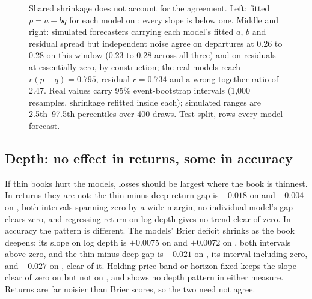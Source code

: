 \begin{figure}[!tbp]
\centering

\caption{Shared shrinkage does not account for the agreement. Left: fitted $p = a + bq$ for
each model on \winB; every slope is below one. Middle and right: simulated forecasters
carrying each model's fitted $a$, $b$ and residual spread but independent noise agree on
departures at 0.26 to 0.28 on this window (0.23 to 0.28 across all three) and on residuals at
essentially zero, by construction; the real models reach $r(p-q)=0.795$, residual $r=0.734$ and a
wrong-together ratio of 2.47. Real values carry 95\% event-bootstrap intervals (1,000 resamples, shrinkage
refitted inside each); simulated ranges are 2.5th--97.5th percentiles over 400 draws. Test
split, rows every model forecast.}
\label{fig:shrinkage-null}
\end{figure}

\subsection{Depth: no effect in returns, some in accuracy}
\label{sec:results-depth}

If thin books hurt the models, losses should be largest where the book is
thinnest. In returns they are not:
the thin-minus-deep return gap is $-0.018$ on \winB and $+0.004$ on \winC, both
intervals spanning zero by a wide margin, no individual model's gap clears zero,
and regressing return on log depth gives no trend clear of zero. In accuracy the
pattern is different. The models' Brier deficit shrinks as the book deepens: its slope on
log depth is $+0.0075$ on \winB and $+0.0072$ on \winC, both intervals above
zero, and the thin-minus-deep gap is $-0.021$ on \winB, its interval including zero, and $-0.027$ on \winC, clear of it. Holding price band or horizon
fixed keeps the slope clear of zero on \winC but not on \winB, and \winA shows no
depth pattern in either measure. Returns are far noisier than Brier scores, so
the two need not agree.

